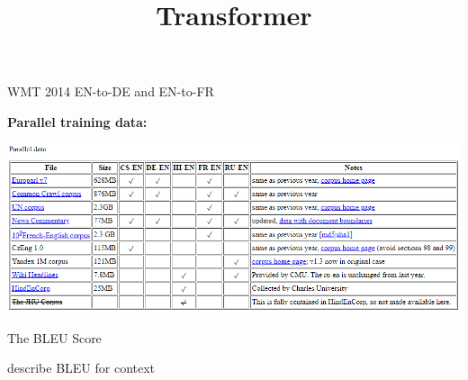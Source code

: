 



\newcommand{\titlefigure}{figure/transformer_sq.png}
\newcommand{\learninggoals}{
\item Understand BPE
\item Understand the Transformer Encoder + Decoder
\item Understand how they are connected
\item Understand the limitations for long sequences}

\title{Transformer}
\date{}




\begin{vbframe}{WMT 2014 EN-to-DE and EN-to-FR}

\vfill

\textbf{Parallel training data:}

\includegraphics[width=.9\textwidth]{figure/wmt14}

\vfill

\end{vbframe}


\begin{vbframe}{The BLEU Score}

describe BLEU for context

\end{vbframe}


